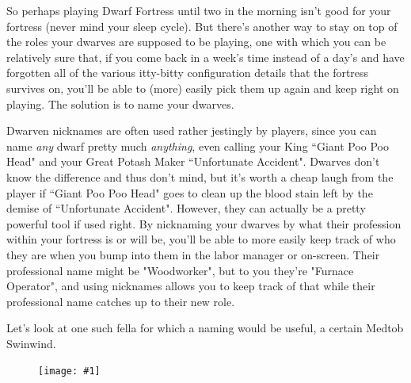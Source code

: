 \documentclass[]{article}
\newcommand{\fullfigure}[1] {
\begin{figure}[h!]
\texttt{[image: \#1]}
\end{figure}
}
\begin{document}
So perhaps playing Dwarf Fortress until two in the morning isn't good for your fortress (never mind your
sleep cycle). But there's another way to stay on top of the roles your dwarves are supposed to be
playing, one with which you can be relatively sure that, if you come back in a week's time instead of a
day's and have forgotten all of the various itty-bitty configuration details that the fortress survives
on, you'll be able to (more) easily pick them up again and keep right on playing. The solution is to 
name your dwarves.

Dwarven nicknames are often used rather jestingly by players, since you can name \emph{any} dwarf pretty
much \emph{anything}, even calling your King ``Giant Poo Poo Head" and your Great Potash Maker
``Unfortunate Accident". Dwarves don't know the difference and thus don't mind, but it's worth a cheap
laugh from the player if ``Giant Poo Poo Head" goes to clean up the blood stain left by the demise of
``Unfortunate Accident". However, they can actually be a pretty powerful tool if used right. By
nicknaming your dwarves by what their profession within your fortress is or will be, you'll be able to
more easily keep track of who they are when you bump into them in the labor manager or on-screen. Their
professional name might be "Woodworker", but to you they're "Furnace Operator", and using nicknames
allows you to keep track of that while their professional name catches up to their new role.

Let's look at one such fella for which a naming would be useful, a certain Medtob Swinwind.

\fullfigure{Sec2Fig13}
\end{document}
